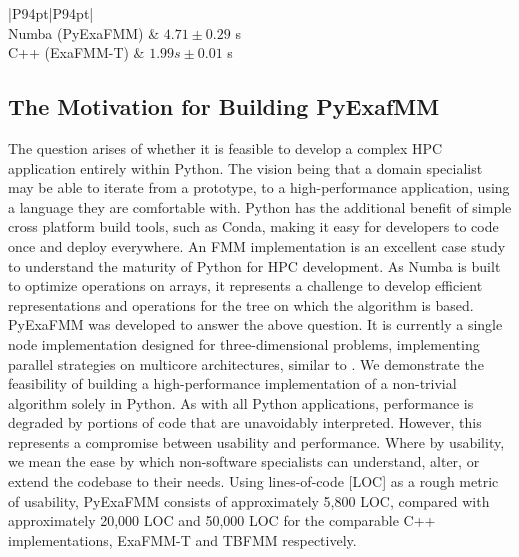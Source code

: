 \documentclass{IEEEcsmag}
\begin{document}
\begin{table}
	\caption{Laplace kernel evaluations over 100,000 randomly distributed particles. Coordinate components, and source charge densities chosen in interval $[0, 1)$. Repeated seven times for statistics.}
	\label{tab:kernel_evals}
	\begin{tabular}{ |P{94pt}|P{94pt}|}
		\hline
		 \\
		\hline
		Numba (PyExaFMM) & $4.71 \pm 0.29$ s \\
		\hline
		C++ (ExaFMM-T)   & $1.99 s \pm 0.01$ s \\
		\hline
	   \end{tabular}
\end{table}

\subsection{The Motivation for Building PyExafMM}

The question arises of whether it is feasible to develop a complex HPC application entirely within Python. The vision being that a domain specialist may be able to iterate from a prototype, to a high-performance application, using a language they are comfortable with. Python has the additional benefit of simple cross platform build tools, such as Conda, making it easy for developers to code once and deploy everywhere. An FMM implementation is an excellent case study to understand the maturity of Python for HPC development. As Numba is built to optimize operations on arrays, it represents a challenge to develop efficient representations and operations for the tree on which the algorithm is based. PyExaFMM was developed to answer the above question. It is currently a single node implementation designed for three-dimensional problems, implementing parallel strategies on multicore architectures, similar to \cite{Bramas2020, Wang2021}. We demonstrate the feasibility of building a high-performance implementation of a non-trivial algorithm solely in Python. As with all Python applications, performance is degraded by portions of code that are unavoidably interpreted. However, this represents a compromise between usability and performance. Where by usability, we mean the ease by which non-software specialists can understand, alter, or extend the codebase to their needs. Using lines-of-code [LOC] as a rough metric of usability, PyExaFMM consists of approximately 5,800 LOC, compared with approximately 20,000 LOC and 50,000 LOC for the comparable C++ implementations, ExaFMM-T \cite{Wang2021} and TBFMM \cite{Bramas2020} respectively.
\end{document}
